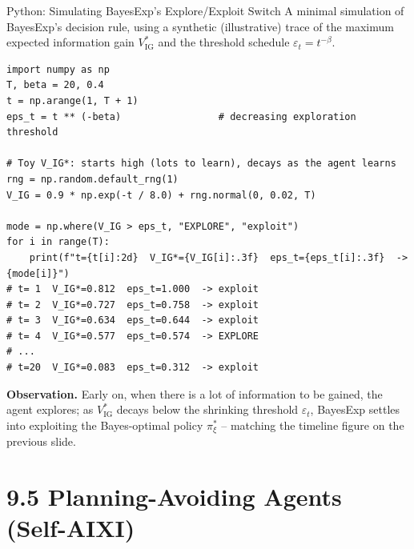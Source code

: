 \documentclass[aspectratio=169,10pt]{beamer}
\newcommand{\IG}{\mathrm{IG}}
\begin{document}
\begin{frame}[fragile]{Python: Simulating BayesExp's Explore/Exploit Switch}
  A minimal simulation of BayesExp's decision rule, using a synthetic
  (illustrative) trace of the maximum expected information gain
  $V_{\IG}^{*}$ and the threshold schedule $\varepsilon_t=t^{-\beta}$.
  \begin{lstlisting}[style=pycode]
import numpy as np
T, beta = 20, 0.4
t = np.arange(1, T + 1)
eps_t = t ** (-beta)                 # decreasing exploration threshold

# Toy V_IG*: starts high (lots to learn), decays as the agent learns
rng = np.random.default_rng(1)
V_IG = 0.9 * np.exp(-t / 8.0) + rng.normal(0, 0.02, T)

mode = np.where(V_IG > eps_t, "EXPLORE", "exploit")
for i in range(T):
    print(f"t={t[i]:2d}  V_IG*={V_IG[i]:.3f}  eps_t={eps_t[i]:.3f}  -> {mode[i]}")
# t= 1  V_IG*=0.812  eps_t=1.000  -> exploit
# t= 2  V_IG*=0.727  eps_t=0.758  -> exploit
# t= 3  V_IG*=0.634  eps_t=0.644  -> exploit
# t= 4  V_IG*=0.577  eps_t=0.574  -> EXPLORE
# ...
# t=20  V_IG*=0.083  eps_t=0.312  -> exploit
  \end{lstlisting}
  \textbf{Observation.} Early on, when there is a lot of information to be
  gained, the agent explores; as $V_{\IG}^{*}$ decays below the shrinking
  threshold $\varepsilon_t$, BayesExp settles into exploiting the
  Bayes-optimal policy $\pi^*_\xi$ -- matching the timeline figure on the
  previous slide.
\end{frame}

\section{9.5 Planning-Avoiding Agents (Self-AIXI)}
\end{document}
